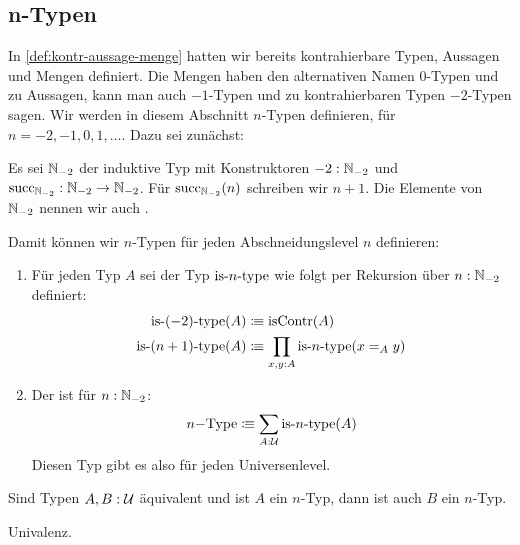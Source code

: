 \subsection{n-Typen}
In \cref{def:kontr-aussage-menge} hatten wir bereits kontrahierbare Typen, Aussagen und Mengen definiert.
Die Mengen haben den alternativen Namen $0$-Typen und zu Aussagen, kann man auch $-1$-Typen und zu kontrahierbaren Typen $-2$-Typen sagen.
Wir werden in diesem Abschnitt $n$-Typen definieren, für $n=-2,-1,0,1,\dots$.
Dazu sei zunächst:
\begin{definition}
  Es sei $\mathbb{N}_{-2}$ der induktive Typ mit Konstruktoren $-2:\mathbb{N}_{-2}$ und $\mathrm{succ}_{\mathbb{N}_{-2}}:\mathbb{N}_{-2}\to\mathbb{N}_{-2}$.
  Für $\mathrm{succ}_{\mathbb{N}_{-2}}(n)$ schreiben wir $n+1$.
  Die Elemente von $\mathbb{N}_{-2}$ nennen wir auch .
\end{definition}
Damit können wir $n$-Typen für jeden Abschneidungslevel $n$ definieren:
\begin{definition}
  \begin{enumerate}
  \item Für jeden Typ $A$ sei der Typ $\mathrm{is}\mbox{-}{n}\mbox{-}\mathrm{type}$ wie folgt per Rekursion über $n:\mathbb{N}_{-2}$ definiert:
    \begin{align*}
      \mathrm{is}\mbox{-}{(-2)}\mbox{-}\mathrm{type}(A)&\vcentcolon\mspace{-1.2mu}\equiv \mathrm{isContr}(A) \\
      \mathrm{is}\mbox{-}{(n+1)}\mbox{-}\mathrm{type}(A)&\vcentcolon\mspace{-1.2mu}\equiv \prod_{x,y:A}\mathrm{is}\mbox{-}{n}\mbox{-}\mathrm{type}(x=_A y)
    \end{align*}
  \item Der  ist für $n:\mathbb{N}_{-2}$:
    \[
      n\mathrm{-Type}\vcentcolon\mspace{-1.2mu}\equiv \sum_{A:\mathcal{U}} \mathrm{is}\mbox{-}{n}\mbox{-}\mathrm{type}(A)
    \]
    Diesen Typ gibt es also für jeden Universenlevel.
  \end{enumerate}
\end{definition}

\begin{lemma}
  Sind Typen $A,B:\mathcal{U}$ äquivalent und ist $A$ ein $n$-Typ, dann ist auch $B$ ein $n$-Typ.
\end{lemma}
\begin{beweis}
  Univalenz.
\end{beweis}

